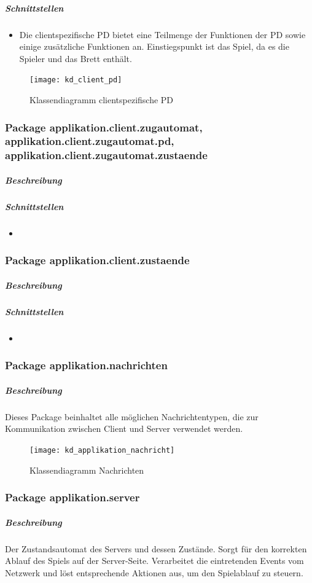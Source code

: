 \documentclass[12pt,halfparskip]{scrartcl}
\begin{document}
		\subparagraph{Schnittstellen}
		\begin{itemize}
			\item Die clientspezifische PD bietet eine Teilmenge der Funktionen der PD sowie einige zusätzliche Funktionen an. Einstiegspunkt ist das Spiel, da es die Spieler und das Brett enthält.
		\end{itemize}

		\begin{figure}[h]
			\centering
			\texttt{[image: kd\_client\_pd]}
			\caption{Klassendiagramm clientspezifische PD}
			\label{fig:kd_client_pd}
		\end{figure}
		
	\subsubsection{Package applikation.client.zugautomat, applikation.client.zugautomat.pd, applikation.client.zugautomat.zustaende}
		\subparagraph{Beschreibung}

		\subparagraph{Schnittstellen}
		\begin{itemize}
			\item 
		\end{itemize}
		
	\subsubsection{Package applikation.client.zustaende}
		\subparagraph{Beschreibung}

		\subparagraph{Schnittstellen}
		\begin{itemize}
			\item 
		\end{itemize}
	
\subsubsection{Package applikation.nachrichten}
	\subparagraph{Beschreibung}
	Dieses Package beinhaltet alle möglichen Nachrichtentypen, die zur Kommunikation zwischen Client und Server verwendet werden.
	\begin{figure}[h]
		\centering
		\texttt{[image: kd\_applikation\_nachricht]}
		\caption{Klassendiagramm Nachrichten}
		\label{fig:kd_applikation_nachricht}
	\end{figure}

\subsubsection{Package applikation.server}
	\subparagraph{Beschreibung}
	Der Zustandsautomat des Servers und dessen Zustände. Sorgt für den korrekten Ablauf des Spiels auf der Server-Seite. Verarbeitet die eintretenden Events vom Netzwerk und löst entsprechende Aktionen aus, um den Spielablauf zu steuern.
\end{document}
